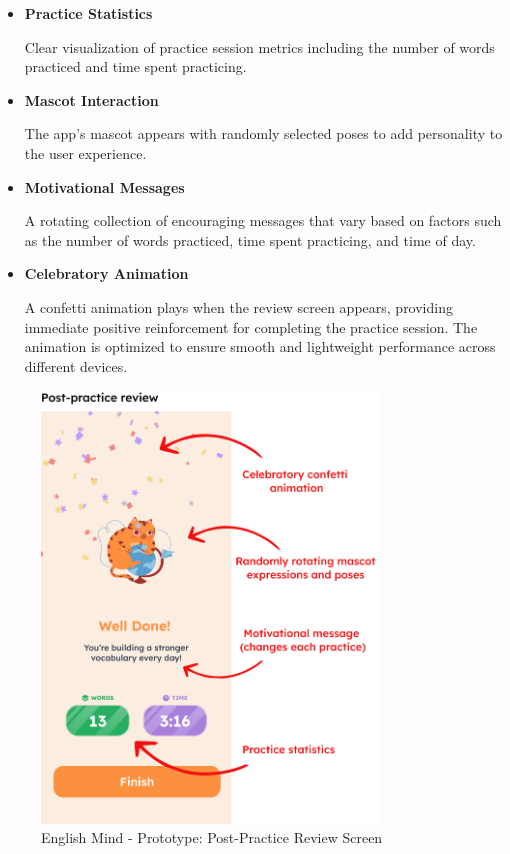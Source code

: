 \begin{itemize}
    \item \textbf{Practice Statistics}
    
    Clear visualization of practice session metrics including the number of words practiced and time spent practicing.
    
    \item \textbf{Mascot Interaction}
    
    The app's mascot appears with randomly selected poses to add personality to the user experience.
    
    \item \textbf{Motivational Messages}
    
    A rotating collection of encouraging messages that vary based on factors such as the number of words practiced, time spent practicing, and time of day.
    
    \item \textbf{Celebratory Animation}
    
    A confetti animation plays when the review screen appears, providing immediate positive reinforcement for completing the practice session. The animation is optimized to ensure smooth and lightweight performance across different devices.
\end{itemize}

\begin{figure}[!h]
    \includegraphics[width=0.8\textwidth]{src/figures/em-prototype-review.png}
    \caption{English Mind - Prototype: Post-Practice Review Screen}
    \label{fig:em-prototype-practice-review}
\end{figure}

